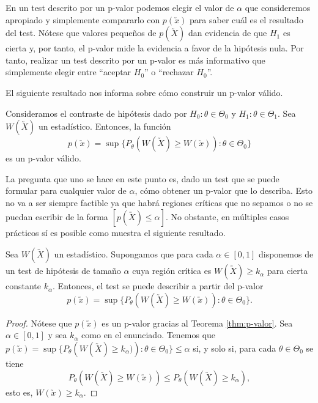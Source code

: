         En un test descrito por un p-valor podemos elegir el valor de $\alpha$ que consideremos apropiado y simplemente compararlo con $p(\utilde{x})$ para saber cuál es el resultado del test. Nótese que valores pequeños de $p(\utilde{X})$ dan evidencia de que $H_1$ es cierta y, por tanto, el p-valor mide la evidencia a favor de la hipótesis nula. Por tanto, realizar un test descrito por un p-valor es más informativo que simplemente elegir entre ``aceptar $H_0$'' o ``rechazar $H_0$''.

        El siguiente resultado nos informa sobre cómo construir un p-valor válido.

        \begin{thm} \label{thm:p-valor}
            Consideramos el contraste de hipótesis dado por $H_0: \theta \in \Theta_0$ y $H_1: \theta \in \Theta_1$. Sea $W(\utilde{X})$ un estadístico. Entonces, la función
            \[p(\utilde{x}) = \sup\{P_\theta(W(\utilde{X}) \ge W(\utilde{x})): \theta \in \Theta_0\}\]
            es un p-valor válido.
        \end{thm}

        La pregunta que uno se hace en este punto es, dado un test que se puede formular para cualquier valor de $\alpha$, cómo obtener un p-valor que lo describa. Esto no va a ser siempre factible ya que habrá regiones críticas que no sepamos o no se puedan escribir de la forma $\left[p(\utilde{X}) \le \alpha\right]$. No obstante, en múltiples casos prácticos sí es posible como muestra el siguiente resultado. %

        \begin{thm} \label{thm:p-valor:2}
            Sea $W(\utilde{X})$ un estadístico. Supongamos que para cada $\alpha \in [0,1]$ disponemos de un test de hipótesis de tamaño $\alpha$ cuya región crítica es $W(\utilde{X}) \ge k_\alpha$ para cierta constante $k_\alpha$. Entonces, el test se puede describir a partir del p-valor
           \[p(\utilde{x}) = \sup\{P_{\theta}\left(W(\utilde{X}) \ge W(\utilde{x})\right): \theta \in \Theta_0\}.\]
       \end{thm}
        \begin{proof}
            Nótese que $p(\utilde{x})$ es un p-valor gracias al Teorema \ref{thm:p-valor}. Sea $\alpha \in [0,1]$ y sea $k_\alpha$ como en el enunciado. Tenemos que $p(\utilde{x}) = \sup\{P_{\theta}\left(W(\utilde{X}) \ge k_\alpha)\right): \theta \in \Theta_0\} \le \alpha$ si, y solo si, para cada $\theta \in \Theta_0$ se tiene
            \[P_{\theta}\left(W(\utilde{X}) \ge W(\utilde{x})\right) \le P_{\theta}\left(W(\utilde{X}) \ge k_\alpha\right) ,\]
            esto es, $W(\utilde{x}) \ge k_\alpha$.
        \end{proof}


